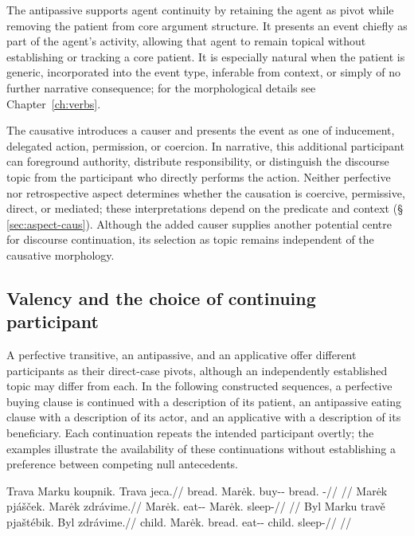 The antipassive supports agent continuity by retaining the agent as pivot
while removing the patient from core argument structure. It presents an
event chiefly as part of the agent's activity, allowing that agent to remain
topical without establishing or tracking a core patient. It is especially natural when
the patient is generic, incorporated into the event type, inferable from
context, or simply of no further narrative consequence; for the morphological
details see Chapter~\ref{ch:verbs}.

The causative introduces a causer and presents the event as one of
inducement, delegated action, permission, or coercion. In narrative, this
additional participant can foreground authority, distribute responsibility,
or distinguish the discourse topic from the participant who directly
performs the action.
Neither perfective nor retrospective aspect determines whether the causation
is coercive, permissive, direct, or mediated; these interpretations depend
on the predicate and context (§\,\ref{sec:aspect-caus}). Although the added
causer supplies another potential centre for discourse continuation, its
selection as topic remains independent of the causative morphology.

\subsection{Valency and the choice of continuing participant}
\label{sec:disc-valency-continuity}

A perfective transitive, an antipassive, and an applicative offer different
participants as their direct-case pivots, although an independently established
topic may differ from each. In the following constructed sequences, a
perfective buying clause is continued with a description of its patient, an
antipassive eating clause with a description of its actor, and an applicative
with a description of its beneficiary. Each continuation repeats the intended
participant overtly; the examples illustrate the availability of these
continuations without establishing a preference between competing null
antecedents.

\pex\label{ex:disc-valency-sequences}
\a
\begingl
\gla Trava Marku koupnik. Trava jeca.//
\glb bread.\Dir{} Marėk.\Trs{} buy-\Trs{}-\Pf{} bread.\Dir{} \Exst{}-\Cont{}//
\glft {}//
\endgl
\a
\begingl
\gla Marėk pjášček. Marėk zdrávime.//
\glb Marėk.\Dir{} eat-\Antip{}-\Pf{} Marėk.\Dir{} sleep-\Prog{}//
\glft {}//
\endgl
\a
\begingl
\gla Byl Marku travě pjaštébik. Byl zdrávime.//
\glb child.\Dir{} Marėk.\Trs{} bread.\Ind{} eat-\Appl{}-\Pf{} child.\Dir{} sleep-\Prog{}//
\glft {}//
\endgl
\xe

